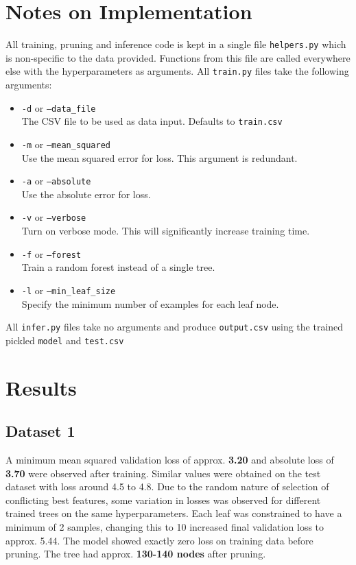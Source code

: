 \documentclass{article}
\begin{document}
\section{Notes on Implementation}
All training, pruning and inference code is kept in a single file \texttt{helpers.py} which is non-specific to the data provided. Functions from this file are called everywhere else with the hyperparameters as arguments. All \texttt{train.py} files take the following arguments:
\begin{itemize}
	\item \texttt{-d} or \texttt{--data\_file}\\
	The CSV file to be used as data input. Defaults to \texttt{train.csv}
	\item \texttt{-m} or \texttt{--mean\_squared}\\
	Use the mean squared error for loss. This argument is redundant.
	\item \texttt{-a} or \texttt{--absolute}\\
	Use the absolute error for loss.
	\item \texttt{-v} or \texttt{--verbose}\\
	Turn on verbose mode. This will significantly increase training time.
	\item \texttt{-f} or \texttt{--forest}\\
	Train a random forest instead of a single tree.
	\item \texttt{-l} or \texttt{--min\_leaf\_size}\\
	Specify the minimum number of examples for each leaf node.
\end{itemize}

All \texttt{infer.py} files take no arguments and produce \texttt{output.csv} using the trained pickled \texttt{model} and \texttt{test.csv}

\newpage

\section{Results}
\subsection{Dataset 1}
A minimum mean squared validation loss of approx. \textbf{3.20} and absolute loss of \textbf{3.70} were observed after training. Similar values were obtained on the test dataset with loss around 4.5 to 4.8. Due to the random nature of selection of conflicting best features, some variation in losses was observed for different trained trees on the same hyperparameters. Each leaf was constrained to have a minimum of 2 samples, changing this to 10 increased final validation loss to approx. 5.44. The model showed exactly zero loss on training data before pruning. The tree had approx. \textbf{130-140 nodes} after pruning.
\end{document}
